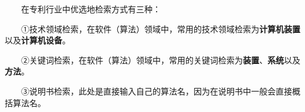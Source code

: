   在专利行业中优选地检索方式有三种：

  ①技术领域检索，在软件（算法）领域中，常用的技术领域检索为\textbf{计算机装置}以及\textbf{计算机设备}。

  ②关键词检索，在软件（算法）领域中，常用的关键词检索为\textbf{装置}、\textbf{系统}以及\textbf{方法}。

  ③说明书检索，此处是直接输入自己的算法名，因为在说明书中一般会直接概括算法名。








